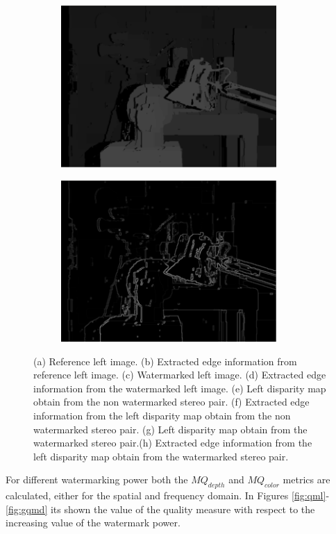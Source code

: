 \begin{figure}[h!]
\begin{subfigure}[]{0.4\textwidth}
\caption{\label{fig:lds}}
\end{subfigure}
\begin{subfigure}[]{0.4\textwidth}
\centering
\includegraphics[width=0.9\textwidth]{./img/rdisp.png}
\caption{\label{fig:rd}}
\end{subfigure}
\begin{subfigure}[]{0.4\textwidth}
\centering
\includegraphics[width=0.9\textwidth]{./img/rdisp_sobel.png}
\caption{\label{rds}}
\end{subfigure}
\caption{\small{(a) Reference left image. (b) Extracted edge information from reference left image. (c) Watermarked left image. (d) Extracted edge information from the watermarked left image. (e) Left disparity map obtain from the non watermarked stereo pair. (f) Extracted edge information from the left disparity map obtain from the non watermarked stereo pair. (g)  Left disparity map obtain from the watermarked stereo pair.(h) Extracted edge information from the left disparity map obtain from the watermarked stereo pair. }\label{fig:sobel}}
\end{figure}
\clearpage
For different watermarking power both the $MQ_{depth}$ and $MQ_{color}$ metrics are calculated, either for the spatial and frequency domain. In Figures \ref{fig:qml}-\ref{fig:gqmd} its shown the value of the quality measure with respect to the increasing value of the watermark power. 

